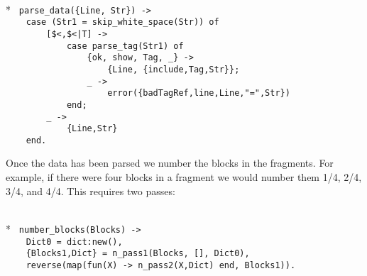 \begin{flushleft}
\label{parsing_12_13}
\\*
\tt
\noindent{}%
\verb&parse_data({Line, Str}) ->&\\
\noindent{}%
\verb&    case (Str1 = skip_white_space(Str)) of&\\
\noindent{}%
\verb&        [$<,$<|T] ->&\\
\noindent{}%
\verb&            case parse_tag(Str1) of&\\
\noindent{}%
\verb&                {ok, show, Tag, _} ->&\\
\noindent{}%
\verb&                    {Line, {include,Tag,Str}};&\\
\noindent{}%
\verb&                _ ->&\\
\noindent{}%
\verb&                    error({badTagRef,line,Line,"=",Str})&\\
\noindent{}%
\verb&            end;&\\
\noindent{}%
\verb&        _ ->&\\
\noindent{}%
\verb&            {Line,Str}&\\
\noindent{}%
\verb&    end.&\\
\end{flushleft}

Once the data has been parsed we number the blocks in the fragments.
For example, if there were four blocks in a fragment we would number them
1/4, 2/4, 3/4, and 4/4.  This requires two passes:

\begin{flushleft}
\label{parsing_13_13}
\\*
\tt
\noindent{}%
\verb&number_blocks(Blocks) -> &\\
\noindent{}%
\verb&    Dict0 = dict:new(),&\\
\noindent{}%
\verb&    {Blocks1,Dict} = n_pass1(Blocks, [], Dict0),&\\
\noindent{}%
\verb&    reverse(map(fun(X) -> n_pass2(X,Dict) end, Blocks1)).&\\
\end{flushleft}


